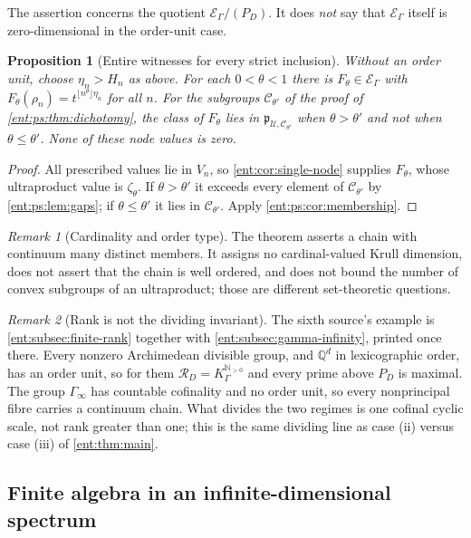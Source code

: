 \documentclass[11pt]{article}
\theoremstyle{plain}
\theoremstyle{plain}
\newtheorem{proposition}[proposition]{Proposition}
\theoremstyle{plain}
\theoremstyle{definition}
\theoremstyle{definition}
\theoremstyle{definition}
\theoremstyle{definition}
\theoremstyle{remark}
\newtheorem{remark}[remark]{Remark}
\newcommand{\Q}{\mathbb Q}\newcommand{\Z}{\mathbb Z}\newcommand{\N}{\mathbb N}
\newcommand{\RD}{\mathcal R_D}\newcommand{\Ucal}{\mathcal U}
\begin{document}
The assertion concerns the quotient $\mathcal E_\Gamma/(P_D)$. It does
\emph{not} say that $\mathcal E_\Gamma$ itself is zero-dimensional in the
order-unit case.

\begin{proposition}[Entire witnesses for every strict inclusion]
\label{ent:ps:prop:witnesses}
Without an order unit, choose $\eta_n>H_n$ as above. For each $0<\theta<1$
there is $F_\theta\in\mathcal E_\Gamma$ with
$F_\theta(\rho_n)=t^{\lfloor n^\theta\rfloor\eta_n}$ for all $n$. For the
subgroups $\mathcal C_{\theta'}$ of the proof of
\cref{ent:ps:thm:dichotomy}, the class of $F_\theta$ lies in
$\mathfrak p_{\Ucal,\mathcal C_{\theta'}}$ when $\theta>\theta'$ and not when
$\theta\le\theta'$. None of these node values is zero.
\end{proposition}
\begin{proof}
All prescribed values lie in $V_n$, so \cref{ent:cor:single-node} supplies
$F_\theta$, whose ultraproduct value is $\zeta_\theta$. If $\theta>\theta'$
it exceeds every element of $\mathcal C_{\theta'}$ by
\cref{ent:ps:lem:gaps}; if $\theta\le\theta'$ it lies in
$\mathcal C_{\theta'}$. Apply \cref{ent:ps:cor:membership}.
\end{proof}

\begin{remark}[Cardinality and order type]
The theorem asserts a chain with continuum many distinct members. It assigns
no cardinal-valued Krull dimension, does not assert that the chain is well
ordered, and does not bound the number of convex subgroups of an
ultraproduct; those are different set-theoretic questions.
\end{remark}

\begin{remark}[Rank is not the dividing invariant]\label{ent:ps:rem:rank}
The sixth source's example is \cref{ent:subsec:finite-rank} together with
\cref{ent:subsec:gamma-infinity}, printed once there. Every nonzero
Archimedean divisible group, and $\Q^d$ in lexicographic order, has an order
unit, so for them $\RD=K_\Gamma^{\N_{>0}}$ and every prime above $P_D$ is
maximal. The group $\Gamma_\infty$ has countable cofinality and no order
unit, so every nonprincipal fibre carries a continuum chain. What divides the
two regimes is one cofinal cyclic scale, not rank greater than one; this is
the same dividing line as case (ii) versus case (iii) of \cref{ent:thm:main}.
\end{remark}

\subsection{Finite algebra in an infinite-dimensional spectrum}
\label{ent:ps:subsec:finite-algebra}
\end{document}
